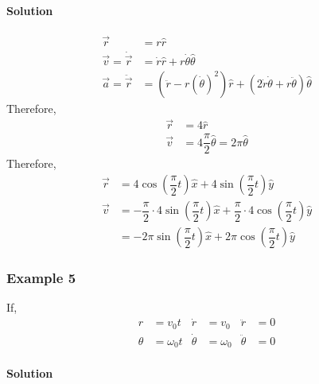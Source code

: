 \documentclass[fleqn]{article}
\begin{document}
\paragraph*{Solution\\}
\begin{align*}
\overrightarrow{r} &= r \hat{r} \\
\overrightarrow{v} = \dot{\overrightarrow{r}} &= \dot{r} \hat{r} + r \dot{\theta} \hat{\theta} \\
\overrightarrow{a} = \ddot{\overrightarrow{r}} &= \left(\ddot{r} - r(\dot{\theta})^2\right) \hat{r} + \left(2 \dot{r} \dot{\theta} + r \ddot{\theta}\right) \hat{\theta}
\end{align*}
Therefore,
\begin{align*}
	\overrightarrow{r} &= 4 \hat{r} \\
	\overrightarrow{v} &= 4 \dfrac{\pi}{2} \hat{\theta} = 2 \pi \hat{\theta}
\end{align*}
Therefore, 
\begin{align*}
	\overrightarrow{r} &= 4 \cos \left(\dfrac{\pi}{2} t \right) \hat{x} + 4 \sin \left(\dfrac{\pi}{2} t \right) \hat{y} \\
	\overrightarrow{v} &= - \dfrac{\pi}{2} \cdot 4 \sin \left(\dfrac{\pi}{2} t \right) \hat{x} + \dfrac{\pi}{2} \cdot 4 \cos \left(\dfrac{\pi}{2} t \right) \hat{y} \\
	&= - 2 \pi \sin \left(\dfrac{\pi}{2} t \right) \hat{x} + 2 \pi \cos \left(\dfrac{\pi}{2} t \right) \hat{y}
\end{align*}

\subsubsection{Example 5}

If,
\begin{align*}
	r &= v_0 t 
	&\dot{r} &= v_0
	&\ddot{r} &= 0 \\
	\theta &= \omega_0 t
	&\dot{\theta} &= \omega_0
	&\ddot{\theta} &= 0
\end{align*}

\paragraph*{Solution\\}
\end{document}
